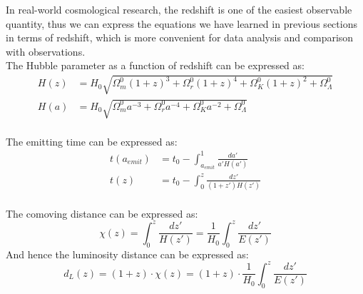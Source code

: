 \bigskip \noindent
\begin{theory}
    In real-world cosmological research, the redshift is one of the easiest observable quantity, thus we can express the equations we have learned in previous sections in terms of redshift, which is more convenient for data analysis and comparison with observations. \\

    The Hubble parameter as a function of redshift can be expressed as:
    \begin{align*}
        H(z) &= H_0\sqrt{\Omega_m^0 (1+z)^3 + \Omega_r^0 (1+z)^4 + \Omega_K^0 (1+z)^2 + \Omega_\Lambda^0} \\
        H(a) &= H_0\sqrt{\Omega_m^0 a^{-3} + \Omega_r^0 a^{-4} + \Omega_K^0 a^{-2} + \Omega_\Lambda^0}
    \end{align*} \\

    The emitting time can be expressed as:
    \begin{align*}
        t(a_{emit}) &= t_0 - \int_{a_{emit}}^{1} \frac{da'}{a'H(a')} \\
        t(z) &= t_0 - \int_0^z \frac{dz'}{(1+z')H(z')}
    \end{align*} \\

    The comoving distance can be expressed as:
    \[
        \chi(z) = \int_0^z \frac{dz'}{H(z')} = \frac{1}{H_0}\int_0^z \frac{dz'}{E(z')}
    \]
    And hence the luminosity distance can be expressed as:
    \[
        d_L(z) = (1+z) \cdot \chi(z) = (1+z) \cdot \frac{1}{H_0}\int_0^z \frac{dz'}{E(z')}
    \]
\end{theory}

